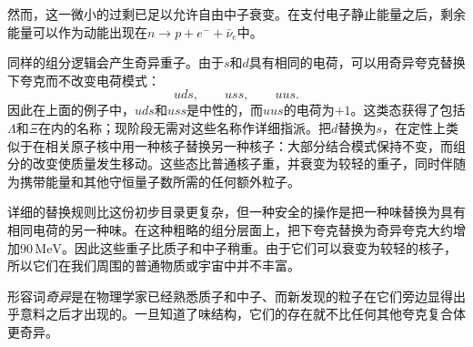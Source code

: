 \begin{classroomqa}
\end{classroomqa}

然而，这一微小的过剩已足以允许自由中子衰变。在支付电子静止能量之后，剩余能量可以作为动能出现在\(n\to p+e^-+\bar\nu_e\)中。

同样的组分逻辑会产生奇异重子。由于\(s\)和\(d\)具有相同的电荷，可以用奇异夸克替换下夸克而不改变电荷模式：
\begin{equation}
uds,\qquad uss,\qquad uus.
\end{equation}
因此在上面的例子中，\(uds\)和\(uss\)是中性的，而\(uus\)的电荷为\(+1\)。这类态获得了包括\(\Lambda\)和\(\Xi\)在内的名称；现阶段无需对这些名称作详细指派。把\(d\)替换为\(s\)，在定性上类似于在相关原子核中用一种核子替换另一种核子：大部分结合模式保持不变，而组分的改变使质量发生移动。这些态比普通核子重，并衰变为较轻的重子，同时伴随为携带能量和其他守恒量子数所需的任何额外粒子。

\begin{classroomqa}
\end{classroomqa}

详细的替换规则比这份初步目录更复杂，但一种安全的操作是把一种味替换为具有相同电荷的另一种味。在这种粗略的组分层面上，把下夸克替换为奇异夸克大约增加\(90\,\mathrm{MeV}\)。因此这些重子比质子和中子稍重。由于它们可以衰变为较轻的核子，所以它们在我们周围的普通物质或宇宙中并不丰富。

\begin{classroomqa}
\end{classroomqa}

\begin{classroomqa}
\end{classroomqa}

形容词\emph{奇异}是在物理学家已经熟悉质子和中子、而新发现的粒子在它们旁边显得出乎意料之后才出现的。一旦知道了味结构，它们的存在就不比任何其他夸克复合体更奇异。

